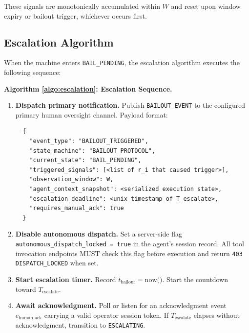 These signals are monotonically accumulated within $W$ and reset upon window expiry or bailout trigger, whichever occurs first.

\bigskip

\subsection{Escalation Algorithm}

When the machine enters \texttt{BAIL\_PENDING}, the escalation algorithm executes the following sequence:

\bigskip

\noindent\textbf{Algorithm \ref{algo:escalation}: Escalation Sequence.}

\begin{algorithm}
\label{algo:escalation}
\begin{enumerate}
  \item \textbf{Dispatch primary notification.} Publish \texttt{BAILOUT\_EVENT} to the configured primary human oversight channel. Payload format:

  \vspace{-2mm}
  \begin{verbatim}
  {
    "event_type": "BAILOUT_TRIGGERED",
    "state_machine": "BAILOUT_PROTOCOL",
    "current_state": "BAIL_PENDING",
    "triggered_signals": [<list of r_i that caused trigger>],
    "observation_window": W,
    "agent_context_snapshot": <serialized execution state>,
    "escalation_deadline": <unix_timestamp of T_escalate>,
    "requires_manual_ack": true
  }
  \end{verbatim}
  \vspace{-2mm}

  \item \textbf{Disable autonomous dispatch.} Set a server-side flag \texttt{autonomous\_dispatch\_locked = true} in the agent's session record. All tool invocation endpoints MUST check this flag before execution and return \texttt{403 DISPATCH\_LOCKED} when set.

  \item \textbf{Start escalation timer.} Record $t_{\text{bailout}} = \text{now()}$. Start the countdown toward $T_{\text{escalate}}$.

  \item \textbf{Await acknowledgment.} Poll or listen for an acknowledgment event $e_{\text{human\_ack}}$ carrying a valid operator session token. If $T_{\text{escalate}}$ elapses without acknowledgment, transition to \texttt{ESCALATING}.


\end{enumerate}
\end{algorithm}
